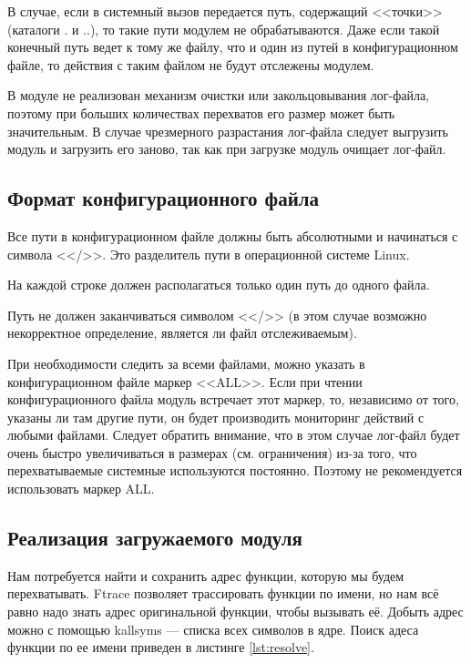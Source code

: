 \documentclass[a4paper,14pt]{article}
\begin{document}
В случае, если в системный вызов передается путь, содержащий <<точки>> (каталоги . и ..), то такие пути модулем не обрабатываются. Даже если такой конечный путь ведет к тому же файлу, что и один из путей в конфигурационном файле, то действия с таким файлом не будут отслежены модулем.

В модуле не реализован механизм очистки или закольцовывания лог-файла, поэтому при больших количествах перехватов его размер может быть значительным. В случае чрезмерного разрастания лог-файла следует выгрузить модуль и загрузить его заново, так как при загрузке модуль очищает лог-файл.

\subsection{Формат конфигурационного файла}

Все пути в конфигурационном файле должны быть абсолютными и начинаться с символа <</>>. Это разделитель пути в операционной системе Linux.

На каждой строке должен располагаться только один путь до одного файла.

Путь не должен заканчиваться символом <</>> (в этом случае возможно некорректное определение, является ли файл отслеживаемым).

При необходимости следить за всеми файлами, можно указать в конфигурационном файле маркер <<ALL>>. Если при чтении конфигурационного файла модуль встречает этот маркер, то, независимо от того, указаны ли там другие пути, он будет производить мониторинг действий с любыми файлами. Следует обратить внимание, что в этом случае лог-файл будет очень быстро увеличиваться в размерах (см. ограничения) из-за того, что перехватываемые системные используются постоянно. Поэтому не рекомендуется использовать маркер ALL.

\subsection{Реализация загружаемого модуля}

Нам потребуется найти и сохранить адрес функции, которую мы будем перехватывать. Ftrace позволяет трассировать функции по имени, но нам всё равно надо знать адрес оригинальной функции, чтобы вызывать её. Добыть адрес можно с помощью kallsyms — списка всех символов в ядре. Поиск адеса функции по ее имени приведен в листинге \ref{lst:resolve}.
\end{document}
